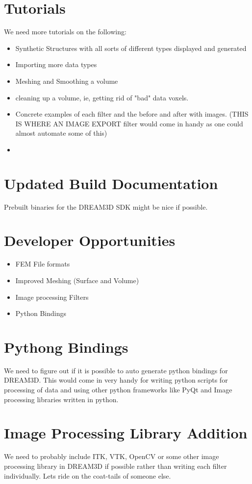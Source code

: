 \documentclass[12pt]{article} %
\begin{document}
\section{Tutorials}
  We need more tutorials on the following:
  \begin{itemize}
  \item Synthetic Structures with all sorts of different types displayed and generated
  \item Importing more data types
  \item Meshing and Smoothing a volume
  \item cleaning up a volume, ie, getting rid of "bad" data voxels.
  \item Concrete examples of each filter and the before and after with images. (THIS IS WHERE AN IMAGE EXPORT filter would come in handy as one could almost automate some of this)
  \item 
  \end{itemize}


\section{Updated Build Documentation}
  Prebuilt binaries for the DREAM3D SDK might be nice if possible.
  
\section{Developer Opportunities}
  \begin{itemize}
  \item FEM File formats
  \item Improved Meshing (Surface and Volume)
  \item Image processing Filters
  \item Python Bindings
  \end{itemize}
  
\section{Pythong Bindings}
  We need to figure out if it is possible to auto generate python bindings for DREAM3D. This would come in very handy for writing python scripts for processing of data and using other python frameworks like PyQt and Image processing libraries written in python.

\section{Image Processing Library Addition}
   We need to probably include ITK, VTK, OpenCV or some other image processing library in DREAM3D if possible rather than writing each filter individually. Lets ride on the coat-tails of someone else.
   
   
   
\end{document}
